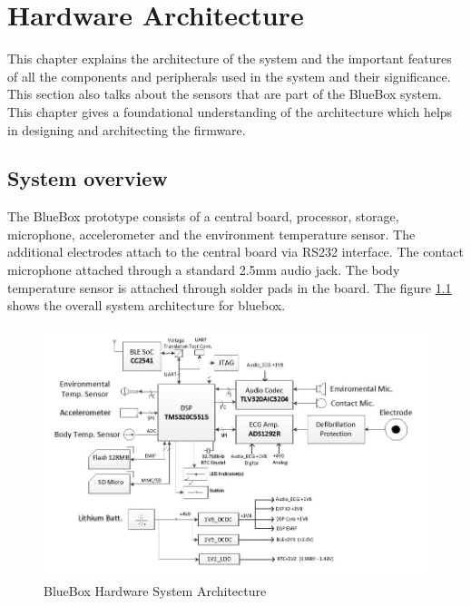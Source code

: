 \chapter{Hardware Architecture}
\hspace{10mm}This chapter explains the architecture of the system and the important features of all the components and peripherals used in the system and their significance. This section also talks about the sensors that are part of the BlueBox system. This chapter gives a foundational understanding of the architecture which helps in designing and architecting the firmware.

\section{System overview}
\hspace{10mm} The BlueBox prototype consists of a central board, processor, storage, microphone, accelerometer and  the environment temperature sensor. The additional electrodes attach to the central board via RS232 interface. The contact microphone attached through a standard 2.5mm audio jack. The body temperature sensor is attached through solder pads in the board. 
The figure \ref{BlueBox_Architecture} shows the overall system architecture for bluebox.
\begin{figure}[h]
	\centering
	\includegraphics[scale = 0.75 ]{BlueBox_Architecture.JPG}
	\caption{BlueBox Hardware System Architecture\label{BlueBox_Architecture}}
\end{figure} 


